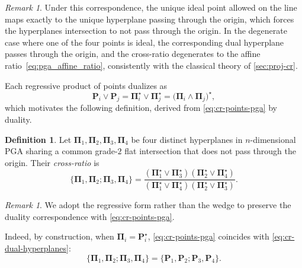 \documentclass{birkjour}
\theoremstyle{definition}
\newtheorem{definition}[theorem]{Definition}
\theoremstyle{remark}
\newtheorem{remark}[theorem]{Remark}
\begin{document}
\begin{remark}
Under this correspondence, the unique ideal point allowed on the line maps exactly to the unique hyperplane passing through the origin, which forces the hyperplanes intersection to not pass through the origin. In the degenerate case where one of the four points is ideal, the corresponding dual hyperplane passes through the origin, and the cross-ratio degenerates to the affine ratio~\eqref{eq:pga_affine_ratio}, consistently with the classical theory of \cref{sec:proj-cr}.
\end{remark}
Each regressive product of points dualizes as
\begin{equation}
  \mathbf{P}_i \vee \mathbf{P}_j
  = \boldsymbol{\Pi}_i^\star \vee \boldsymbol{\Pi}_j^\star
  = \bigl(\boldsymbol{\Pi}_i \wedge \boldsymbol{\Pi}_j\bigr)^\star,
\end{equation}
which motivates the following definition, derived from \cref{eq:cr-points-pga} by duality.
\begin{definition}
\label{def:cr-finite-dual-hyperplanes-pga}
Let $\boldsymbol{\Pi}_1, \boldsymbol{\Pi}_2, \boldsymbol{\Pi}_3, \boldsymbol{\Pi}_4$ be four distinct hyperplanes in $n$-dimensional PGA sharing a common grade-$2$ flat intersection that does not pass through the origin. Their \emph{cross-ratio} is
\begin{equation}
  \{\boldsymbol{\Pi}_1, \boldsymbol{\Pi}_2;
    \boldsymbol{\Pi}_3, \boldsymbol{\Pi}_4\}
  =
  \frac{(\boldsymbol{\Pi}_1^\star \vee \boldsymbol{\Pi}_3^\star)
        (\boldsymbol{\Pi}_2^\star \vee \boldsymbol{\Pi}_4^\star)}
       {(\boldsymbol{\Pi}_1^\star \vee \boldsymbol{\Pi}_4^\star)
        (\boldsymbol{\Pi}_2^\star \vee \boldsymbol{\Pi}_3^\star)}.
  \label{eq:cr-dual-hyperplanes}
\end{equation}
\end{definition}
\begin{remark}
We adopt the regressive form rather than the wedge to preserve the duality correspondence with \eqref{eq:cr-points-pga}.
\end{remark}
Indeed, by construction, when $\boldsymbol{\Pi}_i = \mathbf{P}_i^\star$,
\eqref{eq:cr-points-pga} coincides with \eqref{eq:cr-dual-hyperplanes}:
\begin{equation}
  \{\boldsymbol{\Pi}_1, \boldsymbol{\Pi}_2;
    \boldsymbol{\Pi}_3, \boldsymbol{\Pi}_4\}
  = \{\mathbf{P}_1, \mathbf{P}_2; \mathbf{P}_3, \mathbf{P}_4\}.
\end{equation}
\end{document}
